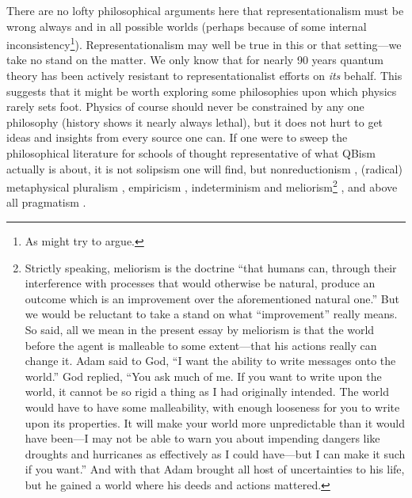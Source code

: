 There are no lofty philosophical arguments here that re\-presentationalism must be wrong always and in all possible worlds (perhaps because of some internal inconsistency\footnote{As \cite{Rorty91} might try to argue.}).  Representationalism may well be true in this or that setting---we take no stand on the matter.  We only know that for nearly 90 years quantum theory has been actively resistant to representationalist efforts on {\it its\/} behalf.  This suggests that it might be worth exploring some philosophies upon which physics rarely sets foot.  Physics of course should never be constrained by any one philosophy (history shows it nearly always lethal), but it does not hurt to get ideas and insights from every source one can.  If one were to sweep the philosophical literature for schools of thought representative of what QBism actually is about, it is not solipsism one will find, but nonreductionism \cite{Dupre93,Cartwright99}, (radical) metaphysical pluralism \cite{James96a,Wahl25}, empiricism \cite{James40,James96b}, indeterminism and meliorism\footnote{Strictly speaking, meliorism is the doctrine ``that humans can, through their interference with processes that would otherwise be natural, produce an outcome which is an improvement over the aforementioned natural one.''  But we would be reluctant to take a stand on what ``improvement'' really means.  So said, all we mean in the present essay by meliorism is that the world before the agent is malleable to some extent---that his actions really can change it.  Adam said to God, ``I want the ability to write messages onto the world.''  God replied, ``You ask much of me.  If you want to write upon the world, it cannot be so rigid a thing as I had originally intended.  The world would have to have some malleability, with enough looseness for you to write upon its properties.  It will make your world more unpredictable than it would have been---I may not be able to warn you about impending dangers like droughts and hurricanes as effectively as I could have---but I can make it such if you want.'' And with that Adam brought all host of uncertainties to his life, but he gained a world where his deeds and actions mattered.} \cite{James1884}, and above all pragmatism \cite{Menand01,Thayer81}.

